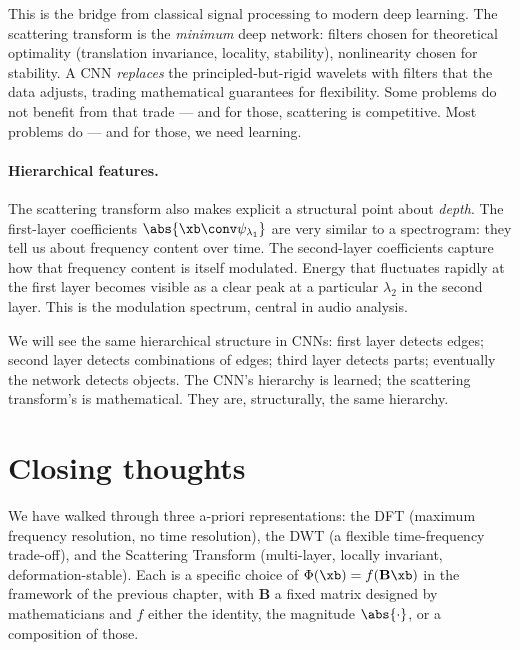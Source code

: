 This is the bridge from classical signal processing to modern deep
learning.  The scattering transform is the \emph{minimum} deep network:
filters chosen for theoretical optimality (translation invariance,
locality, stability), nonlinearity chosen for stability.  A CNN
\emph{replaces} the principled-but-rigid wavelets with filters that the
data adjusts, trading mathematical guarantees for flexibility.  Some
problems do not benefit from that trade --- and for those, scattering is
competitive.  Most problems do --- and for those, we need learning.

\paragraph{Hierarchical features.}  The scattering transform also makes
explicit a structural point about \emph{depth}.  The first-layer
coefficients $\abs{\xb \conv \psi_{\lambda_1}}$ are very similar to a
spectrogram: they tell us about frequency content over time.  The
second-layer coefficients capture how that frequency content is itself
modulated.  Energy that fluctuates rapidly at the first layer becomes
visible as a clear peak at a particular $\lambda_2$ in the second layer.
This is the modulation spectrum, central in audio analysis.

We will see the same hierarchical structure in CNNs: first layer
detects edges; second layer detects combinations of edges; third layer
detects parts; eventually the network detects objects.  The CNN's
hierarchy is learned; the scattering transform's is mathematical.  They
are, structurally, the same hierarchy.

\section{Closing thoughts}

We have walked through three a-priori representations: the DFT
(maximum frequency resolution, no time resolution), the DWT (a
flexible time-frequency trade-off), and the Scattering Transform
(multi-layer, locally invariant, deformation-stable).  Each is a
specific choice of $\Phi(\xb) = f(\mathbf{B}\xb)$ in the framework of
the previous chapter, with $\mathbf{B}$ a fixed matrix designed by
mathematicians and $f$ either the identity, the magnitude
$\abs{\cdot}$, or a composition of those.

